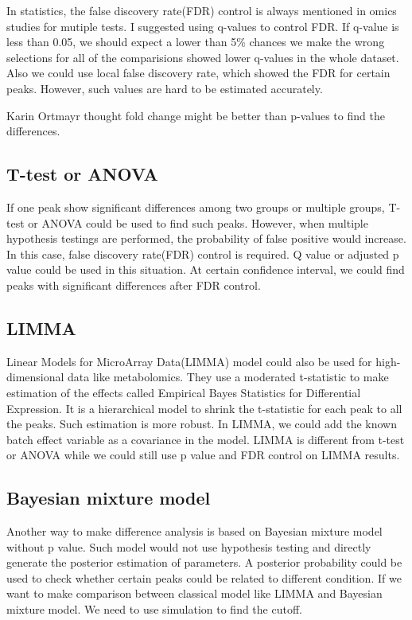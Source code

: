 \documentclass[
]{book}
\begin{document}
In statistics, the false discovery rate(FDR) control is always mentioned in omics studies for mutiple tests. I suggested using q-values to control FDR. If q-value is less than 0.05, we should expect a lower than 5\% chances we make the wrong selections for all of the comparisions showed lower q-values in the whole dataset. Also we could use local false discovery rate, which showed the FDR for certain peaks. However, such values are hard to be estimated accurately.

Karin Ortmayr thought fold change might be better than p-values to find the differences\citep{ortmayr2016a}.

\hypertarget{t-test-or-anova}{%
\subsection{T-test or ANOVA}\label{t-test-or-anova}}

If one peak show significant differences among two groups or multiple groups, T-test or ANOVA could be used to find such peaks. However, when multiple hypothesis testings are performed, the probability of false positive would increase. In this case, false discovery rate(FDR) control is required. Q value or adjusted p value could be used in this situation. At certain confidence interval, we could find peaks with significant differences after FDR control.

\hypertarget{limma}{%
\subsection{LIMMA}\label{limma}}

Linear Models for MicroArray Data(LIMMA) model could also be used for high-dimensional data like metabolomics. They use a moderated t-statistic to make estimation of the effects called Empirical Bayes Statistics for Differential Expression. It is a hierarchical model to shrink the t-statistic for each peak to all the peaks. Such estimation is more robust. In LIMMA, we could add the known batch effect variable as a covariance in the model. LIMMA is different from t-test or ANOVA while we could still use p value and FDR control on LIMMA results.

\hypertarget{bayesian-mixture-model}{%
\subsection{Bayesian mixture model}\label{bayesian-mixture-model}}

Another way to make difference analysis is based on Bayesian mixture model without p value. Such model would not use hypothesis testing and directly generate the posterior estimation of parameters. A posterior probability could be used to check whether certain peaks could be related to different condition. If we want to make comparison between classical model like LIMMA and Bayesian mixture model. We need to use simulation to find the cutoff.
\end{document}
